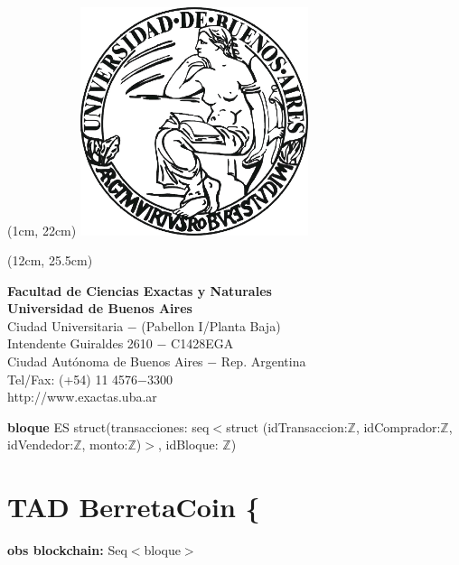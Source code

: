 \documentclass{article}
\newcommand{\Entero}{$\mathds{Z}$}
\begin{document}
\begin{textblock*}{17cm} (1cm, 22cm)
    {
    \includegraphics[width=0.5\textwidth]{uba_logo.jpg}
    }
\end{textblock*}

\begin{textblock*}{20cm} (12cm, 25.5cm)
    {\raggedright\textbf{Facultad de Ciencias Exactas y Naturales}\\
    \textbf{Universidad de Buenos Aires}\\
    Ciudad Universitaria $-$ (Pabellon I/Planta Baja)\\
    Intendente Guiraldes 2610 $-$ C1428EGA\\
    Ciudad Autónoma de Buenos Aires $-$ Rep. Argentina\\
    Tel/Fax: (+54) 11 4576$-$3300\\
    http://www.exactas.uba.ar
    }
\end{textblock*}



\newpage












\setcounter{page}{1}
\textbf{bloque} ES struct(transacciones: seq$<$struct (idTransaccion:\Entero, idComprador:\Entero, idVendedor:\Entero, monto:\Entero)$>$, idBloque: \Entero)\\
\section*{TAD \textdollar BerretaCoin \{}
    \textbf{obs blockchain:} Seq$<$bloque$>$\\\\
\end{document}
